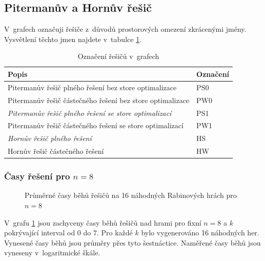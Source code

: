 \subsection{Pitermanův a Hornův řešič}
V~grafech označuji řešiče z~důvodů prostorových omezení zkrácenými jmény. Vysvětlení těchto jmen najdete v~tabulce \ref{tab:oznaceniresicu}.
\begin{table}[htbp]
\caption{Označení řešičů v~grafech} \label{tab:oznaceniresicu}
\begin{tabular}{l|l}
Popis & Označení \\
\hline
Pitermanův řešič plného řešení bez store optimalizace & PS0 \\
Pitermanův řešič částečného řešení bez store optimalizace & PW0 \\
\emph{Pitermanův řešič plného řešení se store optimalizací} & PS1 \\
Pitermanův řešič částečného řešení se store optimalizací & PW1 \\
\emph{Hornův řešič plného řešení} & HS \\
Hornův řešič částečného řešení & HW
\end{tabular}
\end{table}
\subsubsection{Časy řešení pro $n = 8$}
\begin{figure}[htbp]
\centering
{}
\caption{Průměrné časy běhů řešičů na 16 náhodných Rabinových hrách pro $n = 8$}
\label{fig:n8kidcas}
\end{figure}
V~grafu \ref{fig:n8kidcas} jsou zachyceny časy běhů řešičů nad hrami pro fixní $n = 8$ a $k$ pokrývající interval od $0$ do $7$. Pro každé $k$ bylo vygenerováno 16 náhodných her. Vynesené časy běhů jsou průměry přes tyto šestnáctice. Naměřené časy běhů jsou vyneseny v~logaritmické škále.

